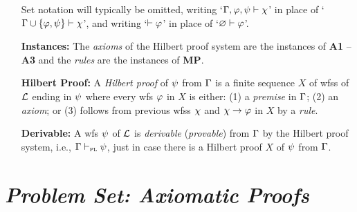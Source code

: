 \documentclass[a4paper, 11pt]{article} %
\begin{document}
\begin{enumerate}[leftmargin=1.2in]
\begin{itemize}[leftmargin=.5in]
	      \end{itemize}
	      Set notation will typically be omitted, writing `$\Gamma, \varphi, \psi \vdash \chi$' in place of `$\Gamma\cup\lbrace\varphi,\psi\rbrace \vdash \chi$', and writing `$\vdash \varphi$' in place of `$\varnothing \vdash\varphi$'.
	\item[\bf Instances:] The \textit{axioms} of the Hilbert proof system are the instances of \textbf{A1} -- \textbf{A3} and the \textit{rules} are the instances of \textbf{MP}.
	\item[\bf Hilbert Proof:] A \textit{Hilbert proof} of $\psi$ from $\Gamma$ is a finite sequence $X$ of wfss of $\mathcal{L}$ ending in $\psi$ where every wfs $\varphi$ in $X$ is either: (1) a \textit{premise} in $\Gamma$; (2) an \textit{axiom}; or (3) follows from previous wfss $\chi$ and $\chi \rightarrow \varphi$ in $X$ by a \textit{rule}.
	\item[\bf Derivable:] A wfs $\psi$ of $\mathcal{L}$ is \textit{derivable} (\textit{provable}) from $\Gamma$ by the Hilbert proof system, i.e., $\Gamma \vdash_{\textsc{pl}} \psi$, just in case there is a Hilbert proof $X$ of $\psi$ from $\Gamma$.
\end{enumerate}


\section*{\it Problem Set: Axiomatic Proofs}
\end{document}
